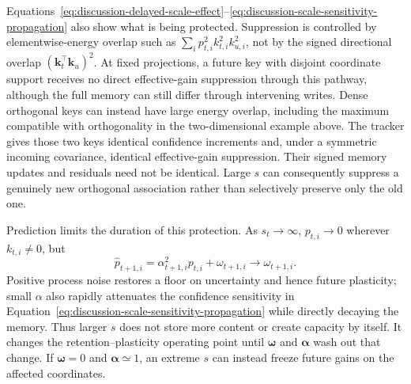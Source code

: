 \documentclass[11pt]{article}
\newcommand{\vct}[1]{\boldsymbol{#1}}
\begin{document}
Equations~\eqref{eq:discussion-delayed-scale-effect}--\eqref{eq:discussion-scale-sensitivity-propagation}
also show what is being protected. Suppression is controlled by elementwise-energy overlap such
as $\sum_i p_{t,i}^2k_{t,i}^2k_{u,i}^2$, not by the signed directional overlap
$(\vct{k}_t^\top\vct{k}_u)^2$. At fixed projections, a future key with disjoint coordinate
support receives no direct effective-gain suppression through this pathway, although the full
memory can still differ through intervening writes. Dense orthogonal keys can instead have large
energy overlap, including the maximum compatible with orthogonality in the two-dimensional
example above. The tracker gives those two keys identical confidence increments and, under a
symmetric incoming covariance, identical effective-gain suppression. Their signed memory updates
and residuals need not be identical. Large $s$ can consequently suppress a genuinely new
orthogonal association rather than selectively preserve only the old one.

Prediction limits the duration of this protection. As $s_t\to\infty$, $p_{t,i}\to0$ wherever
$k_{t,i}\ne0$, but
\begin{equation}
  \widehat p_{t+1,i}=\alpha_{t+1,i}^2p_{t,i}+\omega_{t+1,i}
  \longrightarrow\omega_{t+1,i}.
  \label{eq:discussion-process-noise-plasticity-floor}
\end{equation}
Positive process noise restores a floor on uncertainty and hence future plasticity; small
$\alpha$ also rapidly attenuates the confidence sensitivity in
Equation~\eqref{eq:discussion-scale-sensitivity-propagation} while directly decaying the memory.
Thus larger $s$ does not store more content or create capacity by itself. It changes the
retention--plasticity operating point until $\vct{\omega}$ and $\vct{\alpha}$ wash out that
change. If $\vct{\omega}=0$ and $\vct{\alpha}\simeq1$, an extreme $s$ can instead freeze future
gains on the affected coordinates.
\end{document}
